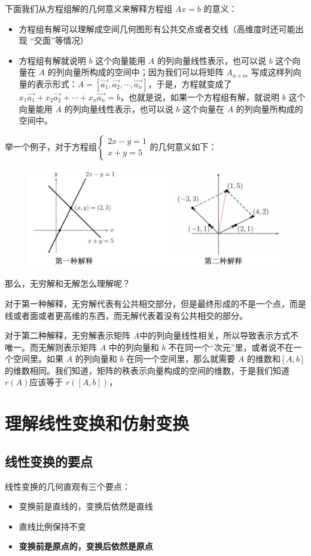 \documentclass[12pt]{article}
\begin{document}
下面我们从方程组解的几何意义来解释方程组 $Ax=b$ 的意义：
\begin{itemize}
\setlength{\itemsep}{0pt}
\setlength{\parsep}{0pt}
\setlength{\parskip}{0pt}
    \item 方程组有解可以理解成空间几何图形有公共交点或者交线（高维度时还可能出现 “交面”等情况）
    \item 方程组有解就说明 $b$ 这个向量能用 $A$ 的列向量线性表示，也可以说 $b$ 这个向量在 $A$ 的列向量所构成的空间中；因为我们可以将矩阵 $A_{n\times m}$ 写成这样列向量的表示形式：$A = [\vec{a_1}, \vec{a_2}, \cdots, \vec{a_n}]$，于是，方程就变成了$x_1\vec{a_1} + x_2\vec{a_2} + \cdots + x_n\vec{a_n}= b$，也就是说，如果一个方程组有解，就说明 $b$ 这个向量能用 
    $A$ 的列向量线性表示，也可以说 $b$ 这个向量在 $A$ 的列向量所构成的空间中。
\end{itemize}

举一个例子，对于方程组$\begin{cases}
2x-y=1 \\ x+y=5
\end{cases}$的几何意义如下：
\begin{figure}[H]
\centering
\includegraphics[width=.5\textwidth]{fig/FantasticMatrix_Season_1_1.png} 
\end{figure}

那么，无穷解和无解怎么理解呢？

对于第一种解释，无穷解代表有公共相交部分，但是最终形成的不是一个点，而是线或者面或者更高维的东西，而无解代表着没有公共相交的部分。

对于第二种解释，无穷解表示矩阵 $A$中的列向量线性相关，所以导致表示方式不唯一。而无解则表示矩阵 $A$ 中的列向量和 $b$ 不在同一个“次元”里，或者说不在一个空间里。如果 $A$ 的列向量和 $b$ 在同一个空间里，那么就需要 $A$ 的维数和$[A,b]$的维数相同。我们知道，矩阵的秩表示向量构成的空间的维数，于是我们知道 $r(A)$应该等于 $r([A,b])$，

\section{理解线性变换和仿射变换\cite{How_To_Understand_Affine_Transformation}}
\subsection{线性变换的要点}
线性变换的几何直观有三个要点：
\begin{itemize}
\setlength{\itemsep}{0pt}
\setlength{\parsep}{0pt}
\setlength{\parskip}{0pt}
    \item 变换前是直线的，变换后依然是直线
    \item 直线比例保持不变
    \item \textbf{变换前是原点的，变换后依然是原点}
\end{itemize}
\end{document}
